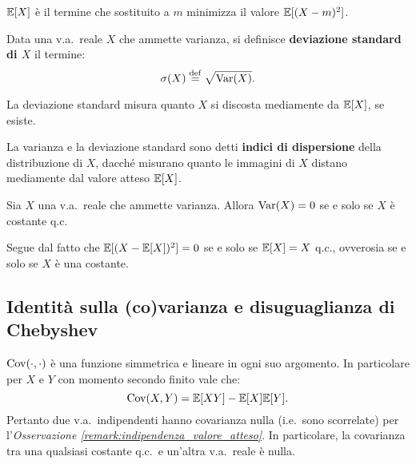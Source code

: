\begin{multicols*}{2}
\begin{proposition}
    $\mathbb{E}[X]$ è il termine che sostituito a $m$ minimizza il valore $\mathbb{E}[(X - m)^2]$.
\end{proposition}

\begin{definition}
    Data una v.a.~reale $X$ che ammette varianza, si definisce
    \textbf{deviazione standard di $X$} il termine:
    \[
        \sigma(X) \overset{\mathrm{def}}{=} \sqrt{\operatorname{Var}(X)}.
    \]
\end{definition}

\begin{remark}
    La deviazione standard misura quanto $X$ si discosta mediamente da
    $\mathbb{E}[X]$, se esiste.
\end{remark}

\begin{remark}
    La varianza e la deviazione standard sono
    detti \textbf{indici di dispersione} della distribuzione
    di $X$, dacché misurano
    quanto le immagini di $X$ distano mediamente dal valore
    atteso $\mathbb{E}[X]$.
\end{remark}

\begin{proposition}
    \label{prop:cono_isotropo}
    Sia $X$ una v.a.~reale che ammette varianza. Allora
    $\operatorname{Var}(X) = 0$ se e solo se $X$ è costante q.c. \smallskip


    Segue dal fatto che $\mathbb{E}[(X -\mathbb{E}[X])^2] = 0$ se e solo se
    $\mathbb{E}[X] = X$ q.c., ovverosia se e solo se $X$ è una costante.
\end{proposition}

\subsection{Identità sulla (co)varianza e disuguaglianza di Chebyshev}

\begin{proposition}
    \label{prop:indipendenza_cov}
    $\operatorname{Cov}(\cdot, \cdot)$ è una funzione simmetrica e
    lineare in ogni suo argomento. In particolare per
    $X$ e $Y$ con momento secondo finito vale che:
    \[
        \operatorname{Cov}(X, Y) = \mathbb{E}[XY] - \mathbb{E}[X] \mathbb{E}[Y].
    \]
    Pertanto due v.a.~indipendenti hanno covarianza nulla (i.e.~sono scorrelate)
    per l'\textit{Osservazione \ref{remark:indipendenza_valore_atteso}}.
    In particolare, la covarianza tra una qualsiasi costante q.c.~e
    un'altra v.a.~reale è nulla.
\end{proposition}


\end{multicols*}
